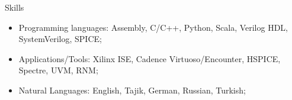 \begin{rSection}{Skills}
  \begin{itemize}
  \item Programming languages: Assembly, C/C++, Python, Scala, Verilog HDL, SystemVerilog, SPICE;
  \item Applications/Tools: Xilinx ISE, Cadence Virtuoso/Encounter, HSPICE, Spectre, UVM, RNM;
  \item Natural Languages: English, Tajik, German, Russian, Turkish;
  \end{itemize}
\end{rSection}
